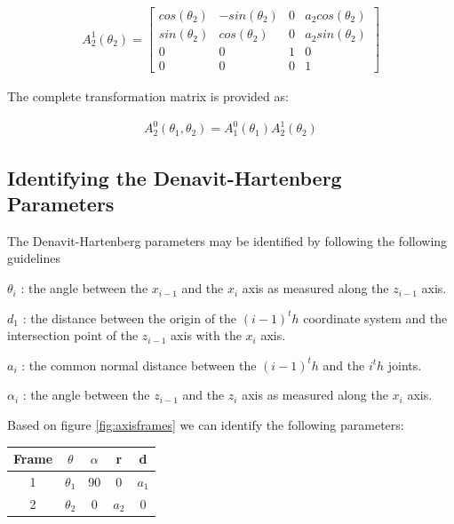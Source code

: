 \documentclass[a4paper, titlepage]{article}
\begin{document}
\begin{equation}
\begin{split}
A^1_{2}(\theta_{2}) = 
\begin{bmatrix}
cos(\theta_{2})  & -sin(\theta_{2}) & 0 & a_{2}cos(\theta_{2})\\ 
sin(\theta_{2})  & cos(\theta_{2}) & 0  & a_{2}sin(\theta_{2})\\ 
0 & 0 & 1 & 0 \\
0 & 0 & 0 & 1
\end{bmatrix}
\end{split}
\label{equ:a12}
\end{equation}

The complete transformation matrix is provided \citep[p.23]{ho90} as:

\begin{equation}
\begin{split}
A^0_{2}(\theta_{1},\theta_{2}) = A^0_{1}(\theta_{1})A^1_{2}(\theta_{2}) 
\end{split}
\label{equ:a02}
\end{equation}



\subsection{Identifying the Denavit-Hartenberg Parameters}

The Denavit-Hartenberg parameters may be identified by following the following guidelines \citep[p.21]{ho90}

$\theta_{i}$ : the angle between the $x_{i-1}$ and the $x_{i}$ axis as measured along the $z_{i-1}$ axis.

$d_{1}$ : the distance between the origin of the $(i-1)^th$ coordinate system and the intersection point of the $z_{i-1}$ axis with the $x_{i}$ axis.

$a_{i}$ : the common normal distance between the $(i-1)^th$ and the $i^th$ joints.

$\alpha_{i}$ : the angle between the $z_{i-1}$ and the $z_{i}$ axis as measured along the $x_{i}$ axis.

Based on figure \ref{fig:axisframes} we can identify the following parameters:

\begin{center}
\begin{tabular}{||c c c c c||} 
 \hline
 Frame & $\theta$ & $\alpha$ & r & d \\ [0.5ex] 
 \hline\hline
 1 & $\theta_{1}$ & 90 & 0 & $a_{1}$ \\
 \hline
2 & $\theta_{2}$ & 0 & $a_{2}$ & 0 \\
 \hline
 \hline
\end{tabular}
\end{center}
\end{document}
